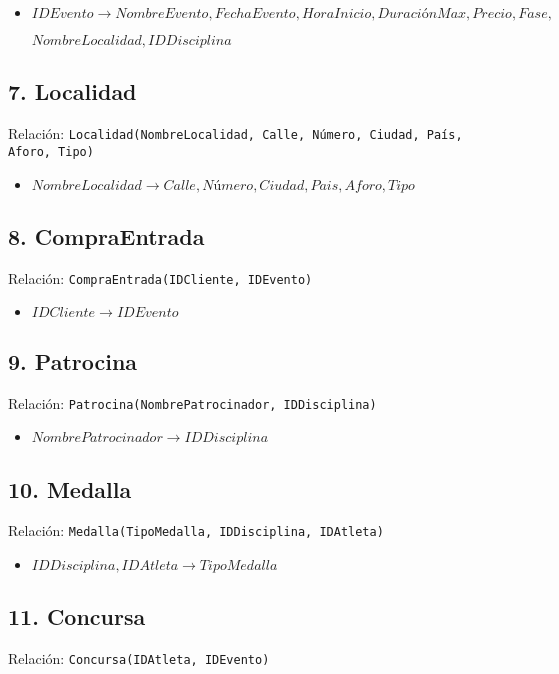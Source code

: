 \begin{itemize}
    \item $IDEvento \rightarrow NombreEvento, FechaEvento, HoraInicio, DuraciónMax, Precio, Fase, $

$NombreLocalidad, IDDisciplina$
\end{itemize}

\subsection*{7. Localidad}
Relación: \texttt{Localidad(NombreLocalidad, Calle, Número, Ciudad, País, Aforo, Tipo)}

\begin{itemize}
    \item $NombreLocalidad \rightarrow Calle, Número, Ciudad, Pais, Aforo, Tipo$
\end{itemize}


\subsection*{8. CompraEntrada}
Relación: \texttt{CompraEntrada(IDCliente, IDEvento)}

\begin{itemize}
    \item $IDCliente \rightarrow IDEvento$
\end{itemize}


\subsection*{9. Patrocina}
Relación: \texttt{Patrocina(NombrePatrocinador, IDDisciplina)}

\begin{itemize}
    \item $NombrePatrocinador \rightarrow IDDisciplina$
\end{itemize}

\subsection*{10. Medalla}
Relación: \texttt{Medalla(TipoMedalla, IDDisciplina, IDAtleta)}

\begin{itemize}
    \item $IDDisciplina, IDAtleta \rightarrow TipoMedalla$
\end{itemize}

\subsection*{11. Concursa}
Relación: \texttt{Concursa(IDAtleta, IDEvento)}

